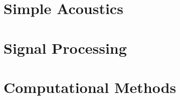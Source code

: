 \documentclass{book}
\begin{document}
\tableofcontents

\chapter{Simple Acoustics}



\chapter{Signal Processing}







\chapter{Computational Methods}




\end{document}
